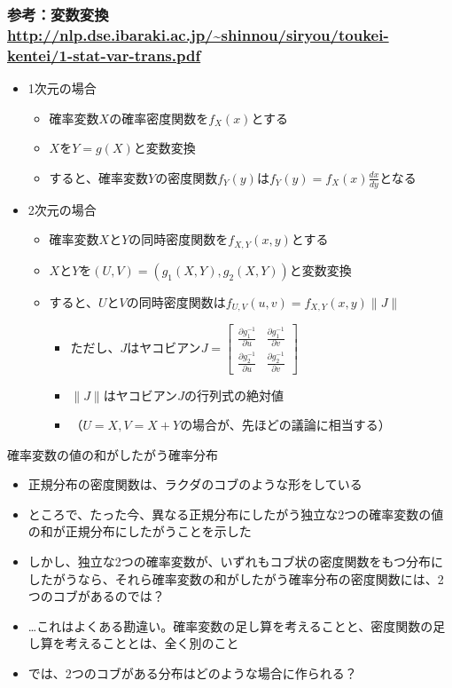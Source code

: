\documentclass[aspectratio=169,unicode,dvipdfmx,14pt]{beamer}
\begin{document}
\begin{frame}
\frametitle{参考：変数変換 \\ \vspace{-.3in} {\footnotesize \href{http://nlp.dse.ibaraki.ac.jp/\~shinnou/siryou/toukei-kentei/1-stat-var-trans.pdf}{\url{http://nlp.dse.ibaraki.ac.jp/~shinnou/siryou/toukei-kentei/1-stat-var-trans.pdf}}}}
\begin{itemize}
\item 1次元の場合
\begin{itemize}
\item 確率変数$X$の確率密度関数を$f_X(x)$とする
\item $X$を$Y=g(X)$と変数変換
\item すると、確率変数$Y$の密度関数$f_Y(y)$は$f_Y(y) = f_X(x) \frac{dx}{dy}$となる
\end{itemize}
\item 2次元の場合
\begin{itemize}
\item 確率変数$X$と$Y$の同時密度関数を$f_{X,Y}(x,y)$とする
\item $X$と$Y$を$(U,V)=(g_1(X,Y), g_2(X,Y))$と変数変換
\item すると、$U$と$V$の同時密度関数は$f_{U,V}(u,v)=f_{X,Y}(x,y)\| J \|$
\begin{itemize}
\item ただし、$J$はヤコビアン$J=\begin{bmatrix} \frac{\partial g_1^{-1}}{\partial u} & \frac{\partial g_1^{-1}}{\partial v} 
\\ \frac{\partial g_2^{-1}}{\partial u} & \frac{\partial g_2^{-1}}{\partial v} \end{bmatrix}$
\item $\| J \|$はヤコビアン$J$の行列式の絶対値
\item[] （$U=X, V=X+Y$の場合が、先ほどの議論に相当する）
\end{itemize}
\end{itemize}

\end{itemize}
\end{frame}


\begin{frame}{確率変数の値の和がしたがう確率分布}
\begin{itemize}
\item 正規分布の密度関数は、ラクダのコブのような形をしている
\item ところで、たった今、異なる正規分布にしたがう独立な2つの確率変数の値の和が正規分布にしたがうことを示した
\item しかし、独立な2つの確率変数が、いずれもコブ状の密度関数をもつ分布にしたがうなら、それら確率変数の和がしたがう確率分布の密度関数には、2つのコブがあるのでは？
\item …これはよくある勘違い。確率変数の足し算を考えることと、密度関数の足し算を考えることとは、全く別のこと
\item では、2つのコブがある分布はどのような場合に作られる？
\end{itemize}
\end{frame}
\end{document}
